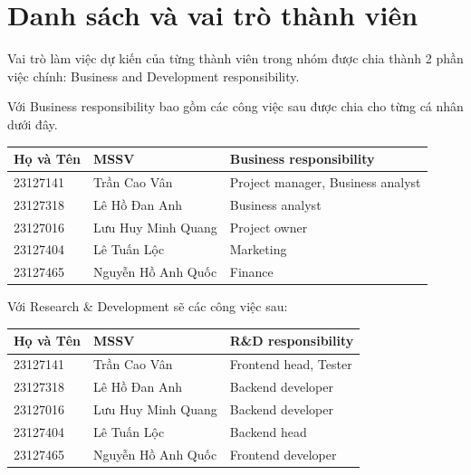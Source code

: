 \section{Danh sách và vai trò thành viên}

Vai trò làm việc dự kiến của từng thành viên trong nhóm được chia thành 2 phần việc chính: Business and Development responsibility.

Với Business responsibility bao gồm các công việc sau được chia cho từng cá nhân dưới đây.

\vspace{0.25cm}
\begin{tabular}{l l l}
\toprule
\textbf{Họ và Tên} & \textbf{MSSV} & \textbf{Business responsibility} \\
\midrule
23127141 & Trần Cao Vân & Project manager, Business analyst \\
23127318 & Lê Hồ Đan Anh & Business analyst \\
23127016 & Lưu Huy Minh Quang & Project owner \\
23127404 & Lê Tuấn Lộc & Marketing \\
23127465 & Nguyễn Hồ Anh Quốc & Finance\\
\bottomrule
\end{tabular}
\vspace{0.5cm}


Với Research \& Development sẽ các công việc sau:

\vspace{0.25cm}
\begin{tabular}{l l l}
\toprule
\textbf{Họ và Tên} & \textbf{MSSV} & \textbf{R\&D responsibility} \\
\midrule
23127141 & Trần Cao Vân & Frontend head, Tester \\
23127318 & Lê Hồ Đan Anh & Backend developer \\
23127016 & Lưu Huy Minh Quang & Backend developer \\
23127404 & Lê Tuấn Lộc & Backend head \\
23127465 & Nguyễn Hồ Anh Quốc & Frontend developer\\
\bottomrule
\end{tabular}
\vspace{0.5cm}
